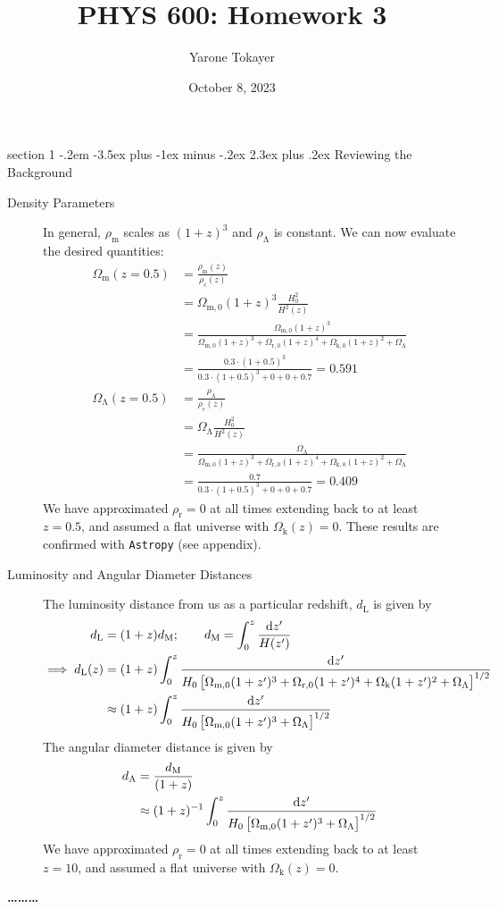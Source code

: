 \documentclass[12pt]{article}
\makeatletter
\newenvironment{problem}{\@startsection
	{section}
	{1}
	{-.2em}
	{-3.5ex plus -1ex minus -.2ex}
	{2.3ex plus .2ex}
	{\pagebreak[3]%
		\large\bf\noindent{Problem }
	}
}
{%
	\begin{center}\large\bf \ldots\ldots\ldots\end{center}}
\newcommand{\Omx}[1]{\ensuremath{\Omega_\mathrm{#1} } }
\newcommand{\rhox}[1]{\ensuremath{\rho_\mathrm{#1} } }
\makeatother
\begin{document}
	
	\title{PHYS 600: Homework 3}
	\author{Yarone Tokayer}
	\date{October 8, 2023}
	
	\maketitle
	
	\thispagestyle{empty}

	\begin{problem}{Reviewing the Background}
		\begin{description}
			\item[Density Parameters] In general, $\rhox{m}$ scales as $(1+z)^3$ and $\rhox{\Lambda}$ is constant.  We can now evaluate the desired quantities: \begin{align*}
				\Omx{m}(z=0.5) &= \frac{\rhox{m}(z)}{\rhox{c}(z)}
				\\
				&= \Omx{m,0} (1+z)^3 \frac{ H_0^2 }{H^2(z)}
				\\
				&= \frac{ \Omx{m,0} (1+z)^3 }{ \Omx{m,0}(1+z)^3 + \Omx{r,0}(1+z)^4 + \Omx{k,0}(1+z)^2 + \Omx{\Lambda} }
				\\
				&= \frac{ 0.3 \cdot (1+0.5)^3 }{  0.3 \cdot (1+0.5)^3 + 0 + 0 + 0.7 } = \boxed{0.591}
				\\
				\Omx{\Lambda}(z=0.5) &= \frac{\rhox{\Lambda}}{\rhox{c}(z)}
				\\
				&= \Omx{\Lambda} \frac{ H_0^2 }{H^2(z)}
				\\
				&= \frac{ \Omx{\Lambda} }{ \Omx{m,0}(1+z)^3 + \Omx{r,0}(1+z)^4 + \Omx{k,0}(1+z)^2 + \Omx{\Lambda} }
				\\
				&= \frac{ 0.7 }{  0.3 \cdot (1+0.5)^3 + 0 + 0 + 0.7 } = \boxed{0.409}
			\end{align*} We have approximated $\rhox{r} = 0$ at all times extending back to at least $z=0.5$, and assumed a flat universe with $\Omx{k}(z) = 0$.  These results are confirmed with \texttt{Astropy} (see appendix).
			
			\item[Luminosity and Angular Diameter Distances] The luminosity distance from us as a particular redshift, $d_\mathrm{L}$ is given by \begin{align*}
				d_\mathrm{L} &= (1 + z)d_\mathrm{M}; \qquad d_\mathrm{M} = \int_0^z \frac{\dif z'}{H(z')}
				\\
				\implies d_\mathrm{L}(z) &= (1 + z)\int_0^z \frac{\dif z'}{H_0\left[\Omx{m,0}(1+z')^3 + \Omx{r,0}(1+z')^4 + \Omx{k}(1+z')^2 + \Omx{\Lambda}\right]^{1/2}}
				\\
				&\approx (1 + z)\int_0^z \frac{\dif z'}{H_0\left[\Omx{m,0}(1+z')^3 + \Omx{\Lambda}\right]^{1/2}}
			\end{align*}  The angular diameter distance is given by \begin{align*}
				d_\mathrm{A} &= \frac{d_\mathrm{M}}{(1+z)}
				\\
				&\approx (1 + z)^{-1}\int_0^z \frac{\dif z'}{H_0\left[\Omx{m,0}(1+z')^3 + \Omx{\Lambda}\right]^{1/2}}
			\end{align*} We have approximated $\rhox{r} = 0$ at all times extending back to at least $z=10$, and assumed a flat universe with $\Omx{k}(z) = 0$.\\
			

\end{description}
\end{problem}
\end{document}
